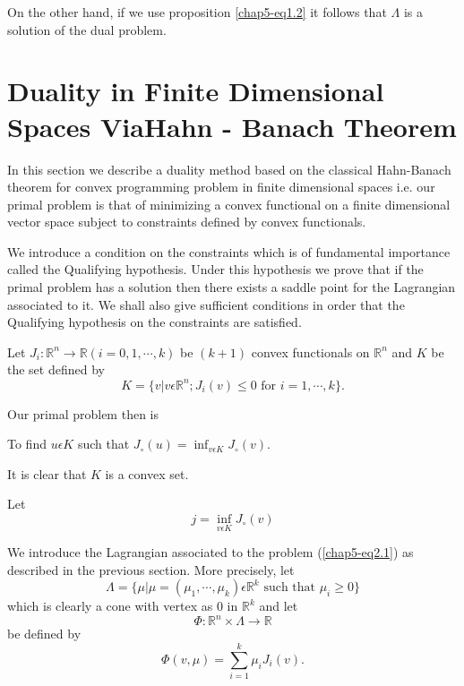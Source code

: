 On the other hand, if we use proposition \ref{chap5-eq1.2} it follows that $\Lambda$ is a solution of the dual problem.

\section[Duality in Finite Dimensional Spaces Via]{Duality in Finite
  Dimensional Spaces Via\hfil\break Hahn - Banach
  Theorem}\label{chap5-sec2} 

In this section we describe a duality method based on the classical Hahn-Banach theorem for convex programming problem in finite dimensional spaces i.e. our primal problem is that of minimizing a convex functional on a finite dimensional vector space subject to constraints defined by convex functionals.

We introduce a condition on the constraints which is of fundamental importance called the Qualifying hypothesis. Under this hypothesis we prove that if the primal problem has a solution then there exists a saddle point for the Lagrangian associated to it. We shall also give sufficient conditions in order that the Qualifying hypothesis on the constraints are satisfied.

Let $J_{i} : \mathbb{R}^{n} \to \mathbb{R} (i = 0, 1, \cdots, k)$ be $(k+1)$ convex functionals on $\mathbb{R}^{n}$ and $K$ be the set defined by
$$
K = \{v | v \epsilon \mathbb{R}^{n} ; J_{i}(v) \leq 0 \text{ for } i = 1, \cdots, k \}.
$$

Our primal problem then is
\begin{problem}\label{chap5-prob2.1}
To find $u \epsilon K$ such that $J_{\circ} (u) = \inf_{v \epsilon K} J_{\circ} (v)$.

It is clear that $K$ is a convex set.

Let
\begin{equation*}
j = \inf_{v \epsilon K} J_{\circ}(v)\tag{2.1}\label{chap5-eq2.1}
\end{equation*}
\end{problem}

We introduce the Lagrangian associated to the problem (\ref{chap5-eq2.1}) as described in the previous section. More precisely, let
$$
\Lambda = \{\mu | \mu = (\mu_{1}, \cdots , \mu_{k}) \epsilon \mathbb{R}^{k} \text{ such that } \mu_{i} \geq 0 \}
$$\pageoriginale
which is clearly a cone with vertex as 0 in $\mathbb{R}^{k}$ and let
$$
\Phi : \mathbb{R}^{n} \times \Lambda \to \mathbb{R} 
$$
be defined by
$$
\Phi (v, \mu) = \sum_{i=1}^{k} \mu_{i} J_{i}(v).
$$

